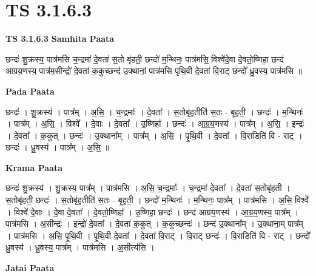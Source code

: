 \documentclass[17pt]{extarticle}
\begin{document}
\section{ TS 3.1.6.3 }

\textbf{TS 3.1.6.3 } \newline
\textbf{Samhita Paata} \newline

छन्दः॑ शु॒क्रस्य॒ पात्र॑मसि च॒न्द्रमा॑ दे॒वता॑ स॒तो बृ॑हती॒ छन्दो॑ म॒न्थिनः॒ पात्र॑मसि॒ विश्वे॑दे॒वा दे॒वतो॒ष्णिहा॒ छन्द॑ आग्रय॒णस्य॒ पात्र॑म॒सीन्द्रो॑ दे॒वता॑ क॒कुच्छन्द॑ उ॒क्थानां॒ पात्र॑मसि पृथि॒वी दे॒वता॑ वि॒राट् छन्दो᳚ ध्रु॒वस्य॒ पात्र॑मसि ॥ \newline

\textbf{Pada Paata} \newline

छन्दः॑ । शु॒क्रस्य॑ । पात्र᳚म् । अ॒सि॒ । च॒न्द्रमाः᳚ । दे॒वता᳚ । स॒तोबृ॑ह॒तीति॑ स॒तः - बृ॒ह॒ती॒ । छन्दः॑ । म॒न्थिनः॑ । पात्र᳚म् । अ॒सि॒ । विश्वे᳚ । दे॒वाः । दे॒वता᳚ । उ॒ष्णिहा᳚ । छन्दः॑ । आ॒ग्र॒य॒णस्य॑ । पात्र᳚म् । अ॒सि॒ । इन्द्रः॑ । दे॒वता᳚ । क॒कुत् । छन्दः॑ । उ॒क्थाना᳚म् । पात्र᳚म् । अ॒सि॒ । पृ॒थि॒वी । दे॒वता᳚ । वि॒राडिति॑ वि - राट् । छन्दः॑ । ध्रु॒वस्य॑ । पात्र᳚म् । अ॒सि॒ ॥  \newline


\textbf{Krama Paata} \newline

छन्दः॑ शु॒क्रस्य॑ । शु॒क्रस्य॒ पात्र᳚म् । पात्र॑मसि । अ॒सि॒ च॒न्द्रमाः᳚ । च॒न्द्रमा॑ दे॒वता᳚ । दे॒वता॑ स॒तोबृ॑हती । स॒तोबृ॑हती॒ छन्दः॑ । स॒तोबृ॑ह॒तीति॑ स॒तः - बृ॒ह॒ती॒ । छन्दो॑ म॒न्थिनः॑ । म॒न्थिनः॒ पात्र᳚म् । पात्र॑मसि । अ॒सि॒ विश्वे᳚ । विश्वे॑ दे॒वाः । दे॒वा दे॒वता᳚ । दे॒वतो॒ष्णिहा᳚ । उ॒ष्णिहा॒ छन्दः॑ । छन्द॑ आग्रय॒णस्य॑ । आ॒ग्र॒य॒णस्य॒ पात्र᳚म् । पात्र॑मसि । अ॒सीन्द्रः॑ । इन्द्रो॑ दे॒वता᳚ । दे॒वता॑ क॒कुत् । क॒कुच्छन्दः॑ । छन्द॑ उ॒क्थाना᳚म् । उ॒क्थाना॒म् पात्र᳚म् । पात्र॑मसि । अ॒सि॒ पृ॒थि॒वी । पृ॒थि॒वी दे॒वता᳚ । दे॒वता॑ वि॒राट् । वि॒राट् छन्दः॑ । वि॒राडिति॑ वि - राट् । छन्दो᳚ ध्रु॒वस्य॑ । ध्रु॒वस्य॒ पात्र᳚म् । पात्र॑मसि । अ॒सीत्य॑सि । \newline

\textbf{Jatai Paata} \newline
\end{document}

